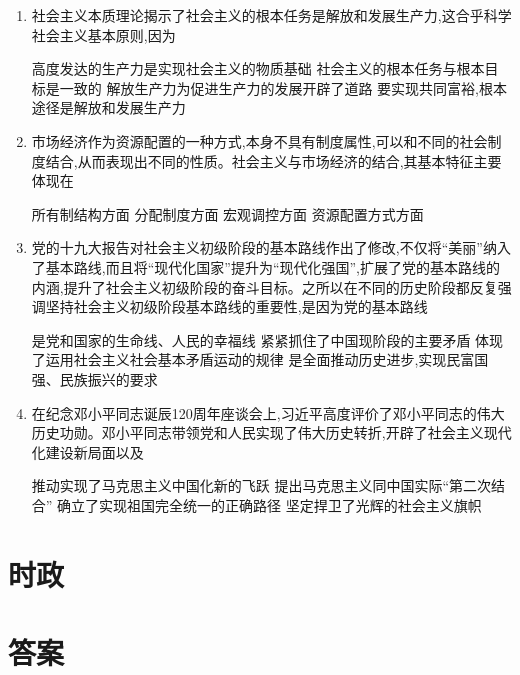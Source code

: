 \documentclass[12pt, a4paper, oneside, UTF8]{ctexbook}
\begin{document}
\begin{enumerate}
    \item 社会主义本质理论揭示了社会主义的根本任务是解放和发展生产力,这合乎科学社会主义基本原则,因为
    \begin{choices}[1]
    \task 高度发达的生产力是实现社会主义的物质基础
    \task 社会主义的根本任务与根本目标是一致的
    \task 解放生产力为促进生产力的发展开辟了道路
    \task 要实现共同富裕,根本途径是解放和发展生产力
    \end{choices}

    \item 市场经济作为资源配置的一种方式,本身不具有制度属性,可以和不同的社会制度结合,从而表现出不同的性质。社会主义与市场经济的结合,其基本特征主要体现在
    \begin{choices}[1]
    \task 所有制结构方面
    \task 分配制度方面
    \task 宏观调控方面
    \task 资源配置方式方面
    \end{choices}

    \item 党的十九大报告对社会主义初级阶段的基本路线作出了修改,不仅将“美丽”纳入了基本路线,而且将“现代化国家”提升为“现代化强国”,扩展了党的基本路线的内涵,提升了社会主义初级阶段的奋斗目标。之所以在不同的历史阶段都反复强调坚持社会主义初级阶段基本路线的重要性,是因为党的基本路线
    \begin{choices}[1]
    \task 是党和国家的生命线、人民的幸福线
    \task 紧紧抓住了中国现阶段的主要矛盾
    \task 体现了运用社会主义社会基本矛盾运动的规律
    \task 是全面推动历史进步,实现民富国强、民族振兴的要求
    \end{choices}

    \item 在纪念邓小平同志诞辰120周年座谈会上,习近平高度评价了邓小平同志的伟大历史功勋。邓小平同志带领党和人民实现了伟大历史转折,开辟了社会主义现代化建设新局面以及
    \begin{choices}[1]
    \task 推动实现了马克思主义中国化新的飞跃
    \task 提出马克思主义同中国实际“第二次结合”
    \task 确立了实现祖国完全统一的正确路径
    \task 坚定捍卫了光辉的社会主义旗帜
    \end{choices}
\end{enumerate}
\section{时政}


\section{答案}
\end{document}

